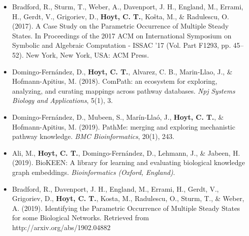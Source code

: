 \begin{itemize}

\item Bradford, R., Sturm, T., Weber, A., Davenport, J. H., England, M., Errami, H., Gerdt, V., Grigoriev, D., \textbf{Hoyt, C. T.}, Košta, M., \& Radulescu, O. (2017). A Case Study on the Parametric Occurrence of Multiple Steady States. In Proceedings of the 2017 ACM on International Symposium on Symbolic and Algebraic Computation - ISSAC ’17 (Vol. Part F1293, pp. 45–52). New York, New York, USA: ACM Press.

\item Domingo-Fernández, D., \textbf{Hoyt, C. T.}, Alvarez, C. B., Marin-Llao, J., \& Hofmann-Apitius, M. (2018). ComPath: an ecosystem for exploring, analyzing, and curating mappings across pathway databases. \textit{Npj Systems Biology and Applications}, 5(1), 3.

\item Domingo-Fernández, D., Mubeen, S., Marín-Llaó, J., \textbf{Hoyt, C. T.}, \& Hofmann-Apitius, M. (2019). PathMe: merging and exploring mechanistic pathway knowledge. \textit{BMC Bioinformatics}, 20(1), 243.

\item Ali, M., \textbf{Hoyt, C. T.}, Domingo-Fernández, D., Lehmann, J., \& Jabeen, H. (2019). BioKEEN: A library for learning and evaluating biological knowledge graph embeddings. \textit{Bioinformatics (Oxford, England)}.

\item Bradford, R., Davenport, J. H., England, M., Errami, H., Gerdt, V., Grigoriev, D., \textbf{Hoyt, C. T.}, Kosta, M., Radulescu, O., Sturm, T., \& Weber, A. (2019). Identifying the Parametric Occurrence of Multiple Steady States for some Biological Networks. Retrieved from http://arxiv.org/abs/1902.04882

\end{itemize}

\tableofcontents
